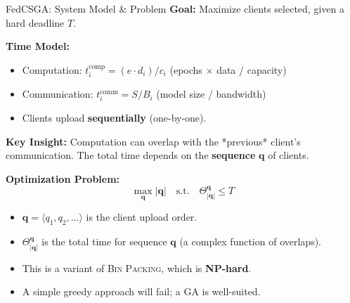 \documentclass{beamer}
\begin{document}
\begin{frame}{FedCSGA: System Model \& Problem}
\textbf{Goal:} Maximize clients selected, given a hard deadline $T$.

\textbf{Time Model:}
\begin{itemize}
    \item Computation: $t_i^{\text{comp}} = (e \cdot d_i) / c_i$ (epochs $\times$ data / capacity)
    \item Communication: $t_i^{\text{comm}} = S / B_i$ (model size / bandwidth)
    \item Clients upload \textbf{sequentially} (one-by-one).
\end{itemize}

\textbf{Key Insight:} Computation can overlap with the *previous* client's communication. The total time depends on the \textbf{sequence} $\mathbf{q}$ of clients.

\textbf{Optimization Problem:}
$$ \max_{\mathbf{q}} |\mathbf{q}| \quad \text{s.t.} \quad \Theta_{|\mathbf{q}|}^{\mathbf{q}} \leq T $$
\begin{itemize}
    \item $\mathbf{q} = \langle q_1, q_2, \ldots \rangle$ is the client upload order.
    \item $\Theta_{|\mathbf{q}|}^{\mathbf{q}}$ is the total time for sequence $\mathbf{q}$ (a complex function of overlaps).
    \item This is a variant of \textsc{Bin Packing}, which is \textbf{NP-hard}.
    \item A simple greedy approach will fail; a GA is well-suited.
\end{itemize}
\end{frame}
\end{document}
